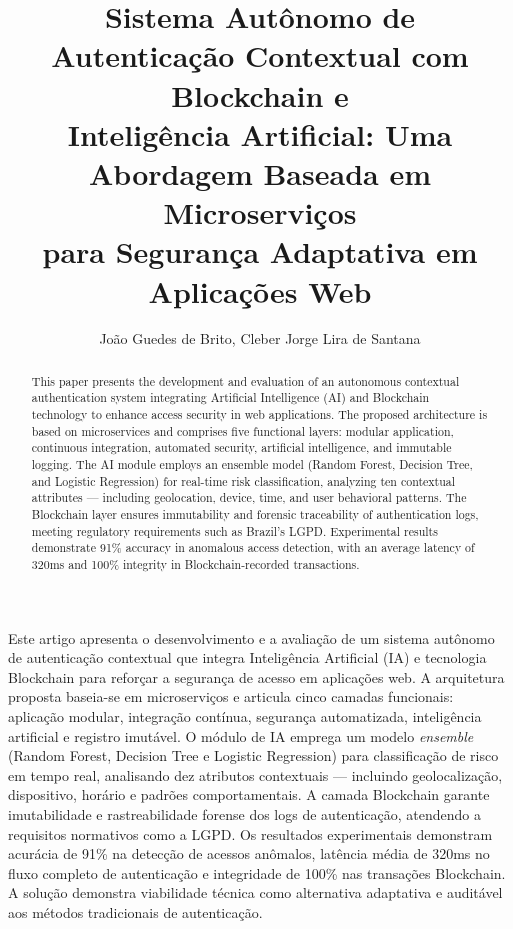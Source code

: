 \documentclass[12pt]{article}
\title{Sistema Autônomo de Autenticação Contextual com Blockchain e\\Inteligência Artificial: Uma Abordagem Baseada em Microserviços\\para Segurança Adaptativa em Aplicações Web}
\author{João Guedes de Brito\inst{1}, Cleber Jorge Lira de Santana\inst{1}}
\begin{document}
\maketitle

\begin{resumo}
Este artigo apresenta o desenvolvimento e a avaliação de um sistema autônomo de autenticação contextual que integra Inteligência Artificial (IA) e tecnologia Blockchain para reforçar a segurança de acesso em aplicações web. A arquitetura proposta baseia-se em microserviços e articula cinco camadas funcionais: aplicação modular, integração contínua, segurança automatizada, inteligência artificial e registro imutável. O módulo de IA emprega um modelo \textit{ensemble} (Random Forest, Decision Tree e Logistic Regression) para classificação de risco em tempo real, analisando dez atributos contextuais --- incluindo geolocalização, dispositivo, horário e padrões comportamentais. A camada Blockchain garante imutabilidade e rastreabilidade forense dos logs de autenticação, atendendo a requisitos normativos como a LGPD. Os resultados experimentais demonstram acurácia de 91\% na detecção de acessos anômalos, latência média de 320ms no fluxo completo de autenticação e integridade de 100\% nas transações Blockchain. A solução demonstra viabilidade técnica como alternativa adaptativa e auditável aos métodos tradicionais de autenticação.
\end{resumo}

\begin{abstract}
This paper presents the development and evaluation of an autonomous contextual authentication system integrating Artificial Intelligence (AI) and Blockchain technology to enhance access security in web applications. The proposed architecture is based on microservices and comprises five functional layers: modular application, continuous integration, automated security, artificial intelligence, and immutable logging. The AI module employs an ensemble model (Random Forest, Decision Tree, and Logistic Regression) for real-time risk classification, analyzing ten contextual attributes --- including geolocation, device, time, and user behavioral patterns. The Blockchain layer ensures immutability and forensic traceability of authentication logs, meeting regulatory requirements such as Brazil's LGPD. Experimental results demonstrate 91\% accuracy in anomalous access detection, with an average latency of 320ms and 100\% integrity in Blockchain-recorded transactions.
\end{abstract}
\end{document}
